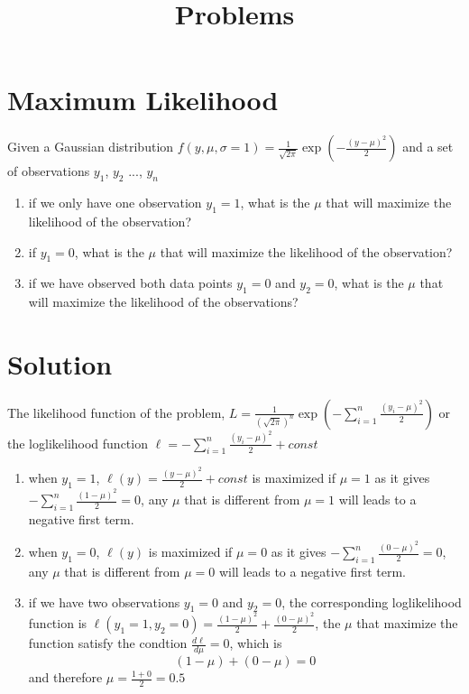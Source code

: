 \documentclass{article}
\title{Problems} %
\begin{document}
\maketitle %
\thispagestyle{fancy}
\pagestyle{fancy}

\section{Maximum Likelihood}

Given a Gaussian distribution $f(y,\mu, \sigma=1)=\frac{1}{\sqrt{2\pi}}\exp(-\frac{(y-\mu)^2}{2})$ and a set of observations $y_1$, $y_2$ ..., $y_n$

\begin{enumerate}
\item  if we only have one observation $y_1=1$, what is the $\mu$ that will maximize the likelihood of the observation?
\item  if $y_1=0$, what is the $\mu$ that will maximize the likelihood of the observation?
\item  if we have observed both data points $y_1=0$ and $y_2=0$, what is the $\mu$ that will maximize the likelihood of the observations?
\end{enumerate}

\section{Solution}
The likelihood function of the problem, $L=\frac{1}{(\sqrt{2\pi})^n}\exp\left( -\sum\limits_{i=1}^n\frac{(y_i-\mu)^2}{2}\right)$ or the loglikelihood function $\ell=-\sum\limits_{i=1}^n\frac{(y_i-\mu)^2}{2}+const$
\begin{enumerate}
\item when $y_1=1$, $\ell(y)=\frac{(y-\mu)^2}{2}+const$ is maximized if $\mu=1$ as it gives $-\sum\limits_{i=1}^n\frac{(1-\mu)^2}{2}=0$, any $\mu$ that is different from $\mu=1$ will leads to a negative first term.
\item when $y_1=0$, $\ell(y)$ is maximized if $\mu=0$ as it gives $-\sum\limits_{i=1}^n\frac{(0-\mu)^2}{2}=0$, any $\mu$ that is different from $\mu=0$ will leads to a negative first term.
\item  if we have two observations $y_1=0$ and $y_2=0$, the corresponding loglikelihood function is $\ell(y_1=1,y_2=0)=\frac{(1-\mu)^2}{2}+\frac{(0-\mu)^2}{2}$, the $\mu$ that maximize the function satisfy the condtion $\frac{d\ell}{d\mu}=0$, which is 
$$(1-\mu)+(0-\mu)=0$$ and therefore $\mu=\frac{1+0}{2}=0.5$
\end{enumerate}
\end{document}
